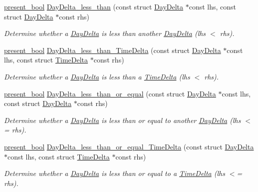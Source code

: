 \begin{DoxyCompactItemize}
\hyperlink{types_8h_a1c24e2cdd988b886e889080ded176ae0}{present\-\_\-bool} \hyperlink{day-delta_8h_a47b5981aba0ded3368ade32fcf77e1fb}{Day\-Delta\-\_\-less\-\_\-than} (const struct \hyperlink{structDayDelta}{Day\-Delta} $\ast$const lhs, const struct \hyperlink{structDayDelta}{Day\-Delta} $\ast$const rhs)
\begin{DoxyCompactList}\small\item\em Determine whether a \hyperlink{structDayDelta}{Day\-Delta} is less than another \hyperlink{structDayDelta}{Day\-Delta} (lhs $<$ rhs). \end{DoxyCompactList}\item 
\hyperlink{types_8h_a1c24e2cdd988b886e889080ded176ae0}{present\-\_\-bool} \hyperlink{day-delta_8h_a4366b3406a89d6aa9f49c007d55cfdf5}{Day\-Delta\-\_\-less\-\_\-than\-\_\-\-Time\-Delta} (const struct \hyperlink{structDayDelta}{Day\-Delta} $\ast$const lhs, const struct \hyperlink{structTimeDelta}{Time\-Delta} $\ast$const rhs)
\begin{DoxyCompactList}\small\item\em Determine whether a \hyperlink{structDayDelta}{Day\-Delta} is less than a \hyperlink{structTimeDelta}{Time\-Delta} (lhs $<$ rhs). \end{DoxyCompactList}\item 
\hyperlink{types_8h_a1c24e2cdd988b886e889080ded176ae0}{present\-\_\-bool} \hyperlink{day-delta_8h_ad8c2d0d57be8633a7c47eaf7d5d018b0}{Day\-Delta\-\_\-less\-\_\-than\-\_\-or\-\_\-equal} (const struct \hyperlink{structDayDelta}{Day\-Delta} $\ast$const lhs, const struct \hyperlink{structDayDelta}{Day\-Delta} $\ast$const rhs)
\begin{DoxyCompactList}\small\item\em Determine whether a \hyperlink{structDayDelta}{Day\-Delta} is less than or equal to another \hyperlink{structDayDelta}{Day\-Delta} (lhs $<$= rhs). \end{DoxyCompactList}\item 
\hyperlink{types_8h_a1c24e2cdd988b886e889080ded176ae0}{present\-\_\-bool} \hyperlink{day-delta_8h_a9c0e055dbc51a99f3f1d0d9b30a9f8ea}{Day\-Delta\-\_\-less\-\_\-than\-\_\-or\-\_\-equal\-\_\-\-Time\-Delta} (const struct \hyperlink{structDayDelta}{Day\-Delta} $\ast$const lhs, const struct \hyperlink{structTimeDelta}{Time\-Delta} $\ast$const rhs)
\begin{DoxyCompactList}\small\item\em Determine whether a \hyperlink{structDayDelta}{Day\-Delta} is less than or equal to a \hyperlink{structTimeDelta}{Time\-Delta} (lhs $<$= rhs). \end{DoxyCompactList}\item 

\end{DoxyCompactItemize}
